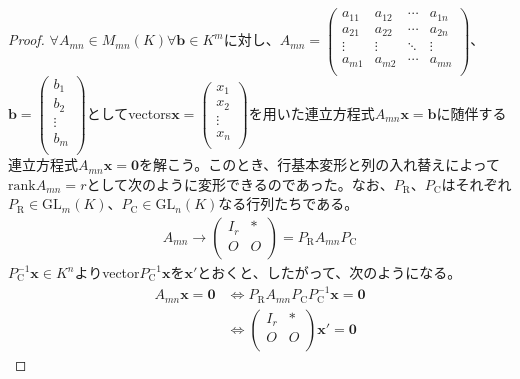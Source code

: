 \documentclass[dvipdfmx]{jsarticle}
\begin{document}
\begin{proof}
$\forall A_{mn} \in M_{mn}(K)\forall\mathbf{b} \in K^{m}$に対し、$A_{mn} = \begin{pmatrix}
a_{11} & a_{12} & \cdots & a_{1n} \\
a_{21} & a_{22} & \cdots & a_{2n} \\
 \vdots & \vdots & \ddots & \vdots \\
a_{m1} & a_{m2} & \cdots & a_{mn} \\
\end{pmatrix}$、$\mathbf{b} = \begin{pmatrix}
b_{1} \\
b_{2} \\
 \vdots \\
b_{m} \\
\end{pmatrix}$としてvectors$\mathbf{x} = \begin{pmatrix}
x_{1} \\
x_{2} \\
 \vdots \\
x_{n} \\
\end{pmatrix}$を用いた連立方程式$A_{mn}\mathbf{x} = \mathbf{b}$に随伴する連立方程式$A_{mn}\mathbf{x} = \mathbf{0}$を解こう。このとき、行基本変形と列の入れ替えによって${\mathrm{rank}}A_{mn} = r$として次のように変形できるのであった。なお、$P_{\mathrm{R}}$、$P_{\mathrm{C}}$はそれぞれ$P_{\mathrm{R}} \in {\mathrm{GL}}_{m}(K)$、$P_{\mathrm{C}} \in {\mathrm{GL}}_{n}(K)$なる行列たちである。
\begin{align*}
A_{mn} \rightarrow \begin{pmatrix}
I_{r} & * \\
O & O \\
\end{pmatrix} = P_{\mathrm{R}}A_{mn}P_{\mathrm{C}}
\end{align*}
$P_{\mathrm{C}}^{- 1}\mathbf{x} \in K^{n}$よりvector$P_{\mathrm{C}}^{- 1}\mathbf{x}$を$\mathbf{x}'$とおくと、したがって、次のようになる。
\begin{align*}
A_{mn}\mathbf{x} = \mathbf{0} &\Leftrightarrow P_{\mathrm{R}}A_{mn}P_{\mathrm{C}}P_{\mathrm{C}}^{- 1}\mathbf{x} = \mathbf{0}\\
&\Leftrightarrow \begin{pmatrix}
I_{r} & * \\
O & O \\
\end{pmatrix}\mathbf{x}' = \mathbf{0}
\end{align*}

\end{proof}
\end{document}
